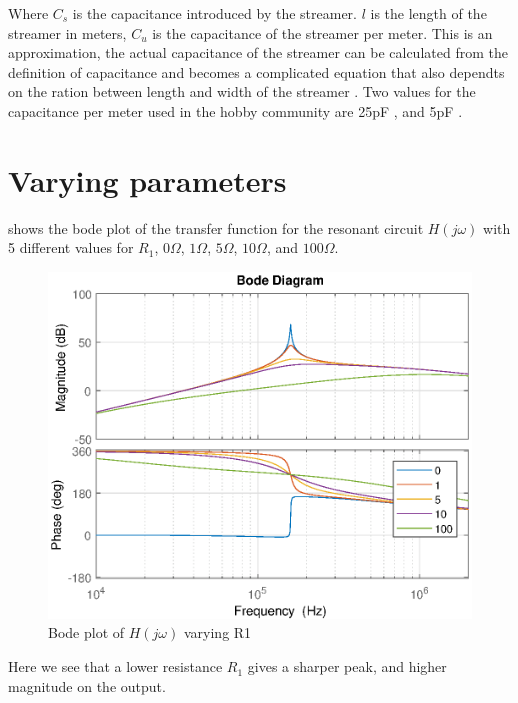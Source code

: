 Where $C_s$ is the capacitance introduced by the streamer. $l$ is the length of the streamer in meters, $C_u$ is the capacitance of the streamer per meter. This is an approximation, the actual capacitance of the streamer can be calculated from the definition of capacitance and becomes a complicated equation that also dependts on the ration between length and width of the streamer \citep{thinstraight}. Two values for the capacitance per meter used in the hobby community are 25pF \citep{conner}, and 5pF \citep{scantesla}.

\newpage
\section{Varying parameters}

 shows the bode plot of the transfer function for the resonant circuit $H(j\omega)$ with 5 different values for $R_1$, $0\Omega$, $1\Omega$, $5\Omega$, $10\Omega$, and $100\Omega$.

\begin{figure}[H]
    \centering
    \includegraphics[width=\textwidth]{img/CoilRigBode_R1.eps}
    \caption{Bode plot of $H(j\omega)$ varying R1}
    \label{fig:bode_r1}
\end{figure}

Here we see that a lower resistance $R_1$ gives a sharper peak, and higher magnitude on the output.

